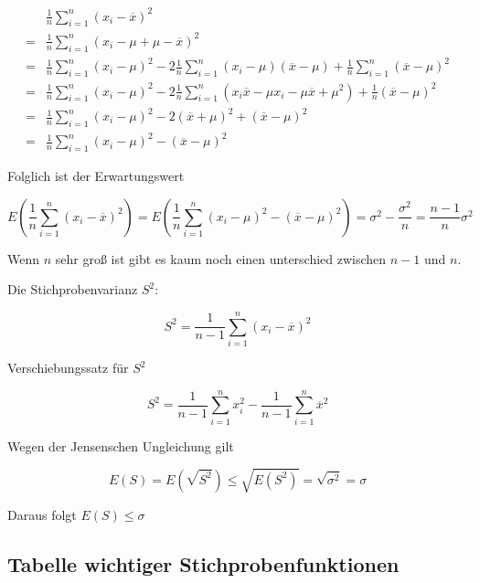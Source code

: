 \documentclass[a4paper]{article}
\begin{document}
\begin{align}
      & \frac{1}{n} \sum_{i=1}^{n} (x_i - \overline{x})^2\\
    = & \frac{1}{n} \sum_{i=1}^{n} (x_i - \mu + \mu - \overline{x})^2\\
    = & \frac{1}{n} \sum_{i=1}^{n} (x_i - \mu)^2 - 2 \frac{1}{n} \sum_{i=1}^{n} (x_i-\mu)(\overline{x}-\mu) + \frac{1}{n} \sum_{i=1}^{n} (\overline{x}-\mu)^2 \\
    = & \frac{1}{n} \sum_{i=1}^{n} (x_i - \mu)^2 - 2 \frac{1}{n} \sum_{i=1}^{n} (x_i\overline{x}-\mu x_i - \mu\overline{x} + \mu^2) + \frac{1}{n} (\overline{x}-\mu)^2 \\
    = & \frac{1}{n} \sum_{i=1}^{n} (x_i - \mu)^2 - 2 (\overline{x} + \mu)^2 + (\overline{x}-\mu)^2\\
    = & \frac{1}{n} \sum_{i=1}^{n} (x_i - \mu)^2 - (\overline{x}-\mu)^2
\end{align}

Folglich ist der Erwartungswert

\[
E(\frac{1}{n} \sum_{i=1}^{n} (x_i - \overline{x})^2) = E(\frac{1}{n} \sum_{i=1}^{n} (x_i - \mu)^2 - (\overline{x}-\mu)^2) = \sigma^2 - \frac{\sigma^2}{n} = \frac{n-1}{n} \sigma^2
\]

Wenn $n$ sehr groß ist gibt es kaum noch einen unterschied zwischen $n-1$ und $n$.

Die Stichprobenvarianz $S^2$:

\[
S^2 = \frac{1}{n-1} \sum_{i=1}^{n} (x_i - \overline{x})^2
\]

Verschiebungssatz für $S^2$

\[
S^2 = \frac{1}{n-1} \sum_{i=1}^{n} x_i^2 - \frac{1}{n-1} \sum_{i=1}^{n} \overline{x}^2
\]

Wegen der Jensenschen Ungleichung gilt

\[
E(S) = E(\sqrt{S^2}) \leq \sqrt{E(S^2)} = \sqrt{\sigma^2} = \sigma
\]

Daraus folgt $E(S) \leq \sigma$

\subsection{Tabelle wichtiger Stichprobenfunktionen}
\end{document}
